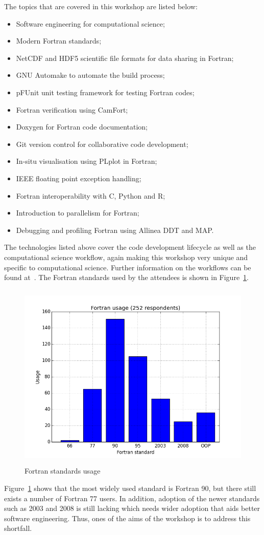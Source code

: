 \documentclass[12pt]{article}
\begin{document}
The topics that are covered in this workshop are listed below:
\begin{itemize}
\item Software engineering for computational science;
\item Modern Fortran standards;
\item NetCDF and HDF5 scientific file formats for data sharing in Fortran;
\item GNU Automake to automate the build process;
\item pFUnit unit testing framework for testing Fortran codes;
\item Fortran verification using CamFort;
\item Doxygen for Fortran code documentation;
\item Git version control for collaborative code development;
\item In-situ visualisation using PLplot in Fortran;
\item IEEE floating point exception handling;
\item Fortran interoperability with C, Python and R;
\item Introduction to parallelism for Fortran;
\item Debugging and profiling Fortran using Allinea DDT and MAP.
\end{itemize}
The technologies listed above cover the code development lifecycle as well as the computational science workflow,
again making this workshop very unique and specific to computational science. Further information on the
workflows can be found at~\cite{fmw:exp}. The Fortran standards used by the attendees is shown in Figure~\ref{fortran_usage:png}. 
\begin{figure}[H]
\begin{center}
\includegraphics[width=13cm,height=9cm]{fortran_usage.png}
\caption{Fortran standards usage}\label{fortran_usage:png}
\end{center}
\end{figure}
Figure~\ref{fortran_usage:png} shows that the most widely used standard is Fortran 90, but there still exists a number of
Fortran 77 users. In addition, adoption of the newer standards such as 2003 and 2008 is still lacking which needs wider
adoption that aids better software engineering. Thus, ones of the aims of the workshop is to address this shortfall. \\
\end{document}
